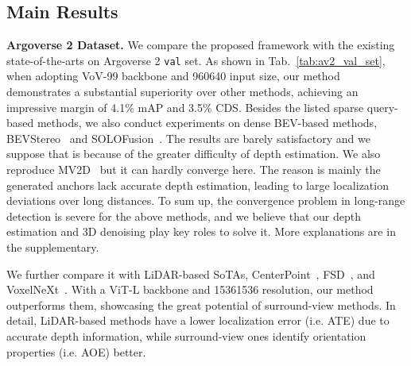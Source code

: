 \documentclass[letterpaper]{article} \usepackage{aaai24}
\begin{document}
\subsection{Main Results}
\noindent\textbf{Argoverse 2 Dataset.}
We compare the proposed framework with the existing state-of-the-arts on Argoverse 2 \texttt{val} set. As shown in Tab.~\ref{tab:av2_val_set}, when adopting VoV-99 backbone and 960640 input size, our method demonstrates a substantial superiority over other methods, achieving an impressive margin of 4.1\% mAP and 3.5\% CDS.
Besides the listed sparse query-based methods, we also conduct experiments on dense BEV-based methods, BEVStereo~\cite{li2022bevstereo} and SOLOFusion~\cite{park2022time}. The results are barely satisfactory and we suppose that is because of the greater difficulty of depth estimation. We also reproduce MV2D~\cite{wang2023object} but it can hardly converge here. The reason is mainly the generated anchors lack accurate depth estimation, leading to large localization deviations over long distances.
To sum up, the convergence problem in long-range detection is severe for the above methods, and we believe that our depth estimation and 3D denoising play key roles to solve it. More explanations are in the supplementary.


\begin{table}[t]
    \centering
    \caption{Ablation study with different score threshold  for 2D proposals.}
    \vspace{-0.2cm}
    \label{tab:ablate_score}
    \tiny
    \vspace{-0.3cm}
\end{table} We further compare it with LiDAR-based SoTAs, CenterPoint~\cite{yin2021center}, FSD~\cite{fan2022fully}, and VoxelNeXt~\cite{chen2023voxelnext}. With a ViT-L backbone and 15361536 resolution, our method outperforms them, showcasing the great potential of surround-view methods. In detail, LiDAR-based methods have a lower localization error (i.e. ATE) due to accurate depth information, while surround-view ones identify orientation properties (i.e. AOE) better. 
\end{document}
